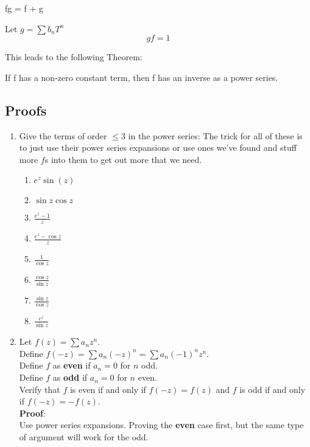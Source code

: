 \begin{thm}
  \; fg = \; f + \; g
\end{thm}

\begin{defn}
  Let $g = \sum b_n T^n$
  \[gf = 1\]
\end{defn}
This leads to the following Theorem:
\begin{thm}
  If f has a non-zero constant term, then f has an inverse as a power series.
\end{thm}

\subsection{Proofs}
\begin{enumerate}
  \item Give the terms of order $\leq 3$ in the power series:
  The trick for all of these is to just use their power series expansions or use ones we've found and stuff more $f$s into them 
  to get out more that we need.
  \begin{enumerate}
    \item $e^z \sin(z)$
    \item $\sin z \cos z$
    \item $\frac{e^z - 1}{z}$
    \item $\frac{e^z - \cos z}{z}$
    \item $\frac{1}{\cos z}$
    \item $\frac{\cos z}{\sin z}$
    \item $\frac{\sin z}{\cos z}$
    \item $\frac{e^z}{\sin z}$
  \end{enumerate}
  
  \item Let $f(z) = \sum a_n z^n$. \\
  Define $f(-z) = \sum a_n (-z)^n = \sum a_n(-1)^n z^n$. \\
  Define $f$ as \textbf{even} if $a_n = 0$ for $n$ odd. \\
  Define $f$ as \textbf{odd} if $a_n = 0$ for $n$ even. \\
  Verify that $f$ is even if and only if $f(-z) = f(z)$ and $f$ is odd if and only if $f(-z) = -f(z).$ \\

  \textbf{Proof}: \\
  Use power series expansions. Proving the \textbf{even} case first, but the same type of argument will work for the odd.


\end{enumerate}
